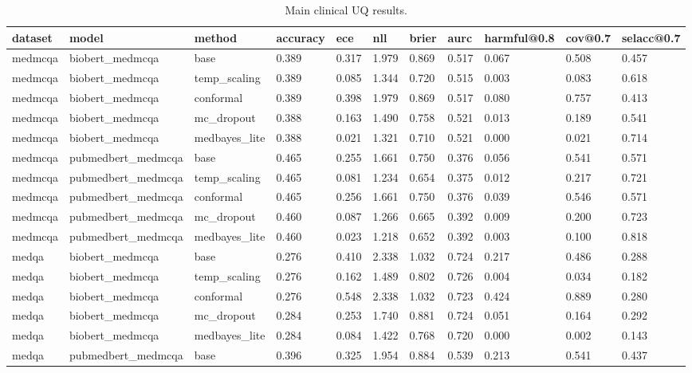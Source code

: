 \begin{table}[htbp]
\centering
\caption{Main clinical UQ results.}
\label{tab:main}
\begin{tabular}{lllllllllll}
\toprule
dataset & model & method & accuracy & ece & nll & brier & aurc & harmful@0.8 & cov@0.7 & selacc@0.7 \\
\midrule
medmcqa & biobert\_medmcqa & base & 0.389 & 0.317 & 1.979 & 0.869 & 0.517 & 0.067 & 0.508 & 0.457 \\
medmcqa & biobert\_medmcqa & temp\_scaling & 0.389 & 0.085 & 1.344 & 0.720 & 0.515 & 0.003 & 0.083 & 0.618 \\
medmcqa & biobert\_medmcqa & conformal & 0.389 & 0.398 & 1.979 & 0.869 & 0.517 & 0.080 & 0.757 & 0.413 \\
medmcqa & biobert\_medmcqa & mc\_dropout & 0.388 & 0.163 & 1.490 & 0.758 & 0.521 & 0.013 & 0.189 & 0.541 \\
medmcqa & biobert\_medmcqa & medbayes\_lite & 0.388 & 0.021 & 1.321 & 0.710 & 0.521 & 0.000 & 0.021 & 0.714 \\
medmcqa & pubmedbert\_medmcqa & base & 0.465 & 0.255 & 1.661 & 0.750 & 0.376 & 0.056 & 0.541 & 0.571 \\
medmcqa & pubmedbert\_medmcqa & temp\_scaling & 0.465 & 0.081 & 1.234 & 0.654 & 0.375 & 0.012 & 0.217 & 0.721 \\
medmcqa & pubmedbert\_medmcqa & conformal & 0.465 & 0.256 & 1.661 & 0.750 & 0.376 & 0.039 & 0.546 & 0.571 \\
medmcqa & pubmedbert\_medmcqa & mc\_dropout & 0.460 & 0.087 & 1.266 & 0.665 & 0.392 & 0.009 & 0.200 & 0.723 \\
medmcqa & pubmedbert\_medmcqa & medbayes\_lite & 0.460 & 0.023 & 1.218 & 0.652 & 0.392 & 0.003 & 0.100 & 0.818 \\
medqa & biobert\_medmcqa & base & 0.276 & 0.410 & 2.338 & 1.032 & 0.724 & 0.217 & 0.486 & 0.288 \\
medqa & biobert\_medmcqa & temp\_scaling & 0.276 & 0.162 & 1.489 & 0.802 & 0.726 & 0.004 & 0.034 & 0.182 \\
medqa & biobert\_medmcqa & conformal & 0.276 & 0.548 & 2.338 & 1.032 & 0.723 & 0.424 & 0.889 & 0.280 \\
medqa & biobert\_medmcqa & mc\_dropout & 0.284 & 0.253 & 1.740 & 0.881 & 0.724 & 0.051 & 0.164 & 0.292 \\
medqa & biobert\_medmcqa & medbayes\_lite & 0.284 & 0.084 & 1.422 & 0.768 & 0.720 & 0.000 & 0.002 & 0.143 \\
medqa & pubmedbert\_medmcqa & base & 0.396 & 0.325 & 1.954 & 0.884 & 0.539 & 0.213 & 0.541 & 0.437 \\

\end{tabular}
\end{table}
